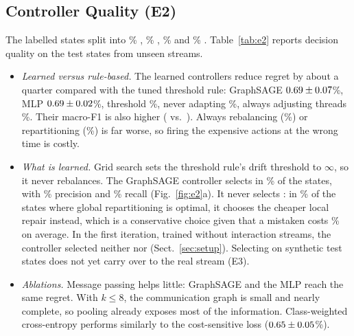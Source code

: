 \begin{table}[t]
\centering
\caption{Static partition quality, $k=8$, mean over 5 seeds: edge cut (\% of $|E|$),
communication volume (CV) and refinement time (ms).}\label{tab:e1}
\end{table}

\subsection{Controller Quality (E2)}
The \NumSamples{} labelled states split into \LabelNO\% \NOA{}, \LabelTA\% \TA{}, \LabelRB\%
\RB{} and \LabelRP\% \RP{}. Table~\ref{tab:e2} reports decision quality on the
\NumTest{} test states from \NumTestGraphs{} unseen streams.
\begin{itemize}
  \item \emph{Learned versus rule-based.} The learned controllers reduce regret by about a
        quarter compared with the tuned threshold rule: GraphSAGE $0.69\pm0.07$\%,
        MLP $0.69\pm0.02$\%, threshold \THregret\%, never adapting \NOregret\%,
        always adjusting threads \TAallregret\%. Their macro-F1 is also higher (\GSFOne{} vs.\
        \THFOne). Always rebalancing (\RBallregret\%) or repartitioning (\RPallregret\%) is far
        worse, so firing the expensive actions at the wrong time is costly.
  \item \emph{What is learned.} Grid search sets the threshold rule's drift threshold to
        $\infty$, so it never rebalances. The GraphSAGE controller selects \RB{} in \GSPredRB\%
        of the states, with \GSRBprec\% precision and \GSRBrecall\% recall (Fig.~\ref{fig:e2}a).
        It never selects \RP{}: in \GSRPasRB\% of the states where global repartitioning is
        optimal, it chooses the cheaper local repair instead, which is a conservative choice
        given that a mistaken \RP{} costs \RPallregret\% on average. In the first iteration,
        trained without interaction streams, the controller selected neither \RB{} nor \RP{}
        (Sect.~\ref{sec:setup}). Selecting \RB{} on synthetic test states does not yet carry over
        to the real stream (E3).
  \item \emph{Ablations.} Message passing helps little: GraphSAGE and the MLP reach the same
        regret. With $k\le 8$, the communication graph is small and nearly complete, so pooling
        already exposes most of the information. Class-weighted cross-entropy performs
        similarly to the cost-sensitive loss ($0.65\pm0.05$\%).
\end{itemize}

